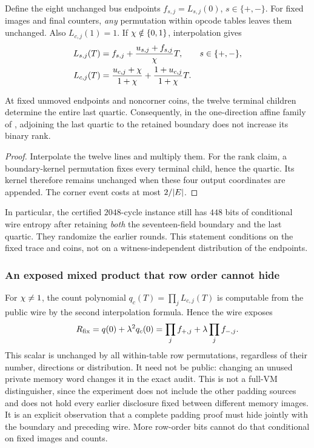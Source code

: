 Define the eight unchanged bus endpoints $f_{s,j}=L_{s,j}(0)$, $s\in\{+,-\}$. For fixed images and final counters, \emph{any} permutation within opcode tables leaves them unchanged. Also $L_{c,j}(1)=1$. If $\chi\notin\{0,1\}$, interpolation gives
\[
\begin{aligned}
 L_{s,j}(T)&=f_{s,j}+\frac{u_{s,j}+f_{s,j}}{\chi} T,
 &&s\in\{+,-\},\\
 L_{c,j}(T)&=\frac{u_{c,j}+\chi}{1+\chi}
             +\frac{1+u_{c,j}}{1+\chi}T.
\end{aligned}
\]

\begin{lemma}
At fixed unmoved endpoints and noncorner coins, the twelve terminal children determine the entire last quartic. Consequently, in the one-direction affine family of , adjoining the last quartic to the retained boundary does not increase its binary rank.
\end{lemma}
\begin{proof}
Interpolate the twelve lines and multiply them. For the rank claim, a boundary-kernel permutation fixes every terminal child, hence the quartic. Its kernel therefore remains unchanged when these four output coordinates are appended. The corner event costs at most $2/|E|$.
\end{proof}

In particular, the certified $2048$-cycle instance still has $448$ bits of conditional wire entropy after retaining \emph{both} the seventeen-field boundary and the last quartic. They randomize the earlier rounds. This statement conditions on the fixed trace and coins, not on a witness-independent distribution of the endpoints.

\subsubsection{An exposed mixed product that row order cannot hide}

For $\chi\ne1$, the count polynomial $q_c(T)=\prod_j L_{c,j}(T)$ is computable from the public wire by the second interpolation formula. Hence the wire exposes
\[
 R_{\rm fix}=q(0)+\lambda^2q_c(0)
       =\prod_j f_{+,j}+\lambda\prod_j f_{-,j}.
\]
This scalar is unchanged by all within-table row permutations, regardless of their number, directions or distribution. It need not be public: changing an unused private memory word changes it in the exact audit. This is not a full-VM distinguisher, since the experiment does not include the other padding sources and does not hold every earlier disclosure fixed between different memory images. It is an explicit observation that a complete padding proof must hide jointly with the boundary and preceding wire. More row-order bits cannot do that conditional on fixed images and counts.

